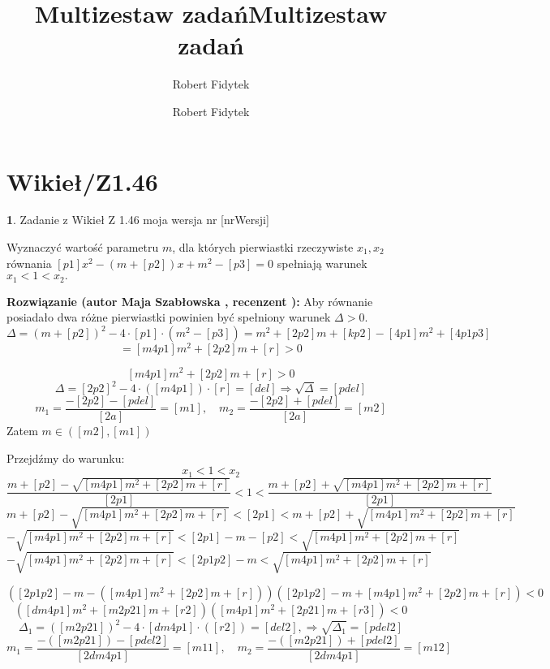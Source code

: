 \documentclass[12pt, a4paper]{article}
\title{Multizestaw zadań}
\author{Robert Fidytek}
\date{}\documentclass[12pt, a4paper]{article}
\title{Multizestaw zadań}
\author{Robert Fidytek}
\date{}
\theoremstyle{definition} %
\newtheorem{zad}{}
\theoremstyle{definition} %
\newtheorem{zad}{}
\newcommand{\kategoria}[1]{\section{#1}} %
\newcommand{\zadStart}[1]{\begin{zad}#1\newline} %
\newcommand{\zadStop}{\end{zad}}   %
\newcommand{\rozwStart}[2]{\noindent \textbf{Rozwiązanie (autor #1 , recenzent #2): }\newline} %
\begin{document}
\maketitle


\kategoria{Wikieł/Z1.46}
\zadStart{Zadanie z Wikieł Z 1.46 moja wersja nr [nrWersji]}

Wyznaczyć wartość parametru $m$, dla których pierwiastki rzeczywiste $x_{1}, x_{2}$ równania $[p1]x^{2}-(m+[p2])x+m^{2}-[p3]=0$ spełniają warunek $x_{1}<1<x_{2}.$
\zadStop

\rozwStart{Maja Szabłowska}{}
Aby równanie posiadało dwa różne pierwiastki powinien być spełniony warunek $\Delta>0.$
$$\Delta=(m+[p2])^{2}-4\cdot[p1]\cdot(m^{2}-[p3])=m^{2}+[2p2]m+[kp2]-[4p1]m^{2}+[4p1p3]$$
$$=[m4p1]m^{2}+[2p2]m+[r]>0$$

$$[m4p1]m^{2}+[2p2]m+[r]>0$$
$$\Delta=[2p2]^{2}-4\cdot([m4p1])\cdot[r]=[del] \Rightarrow \sqrt{\Delta}=[pdel]$$
$$m_{1}=\frac{-[2p2]-[pdel]}{[2a]}=[m1], \quad m_{2}=\frac{-[2p2]+[pdel]}{[2a]}=[m2]$$
Zatem $m\in([m2], [m1])$

Przejdźmy do warunku:
$$x_{1}<1<x_{2}$$
$$\frac{m+[p2]-\sqrt{[m4p1]m^{2}+[2p2]m+[r]}}{[2p1]}<1<\frac{m+[p2]+\sqrt{[m4p1]m^{2}+[2p2]m+[r]}}{[2p1]}$$
$$m+[p2]-\sqrt{[m4p1]m^{2}+[2p2]m+[r]}<[2p1]<m+[p2]+\sqrt{[m4p1]m^{2}+[2p2]m+[r]}$$
$$-\sqrt{[m4p1]m^{2}+[2p2]m+[r]}<[2p1]-m-[p2]<\sqrt{[m4p1]m^{2}+[2p2]m+[r]}$$
$$-\sqrt{[m4p1]m^{2}+[2p2]m+[r]}<[2p1p2]-m<\sqrt{[m4p1]m^{2}+[2p2]m+[r]}$$

$$([2p1p2]-m-([m4p1]m^{2}+[2p2]m+[r]))([2p1p2]-m+[m4p1]m^{2}+[2p2]m+[r])<0$$
$$([dm4p1]m^{2}+[m2p21]m+[r2])([m4p1]m^{2}+[2p21]m+[r3])<0$$
$$\Delta_{1}=([m2p21])^{2}-4\cdot[dm4p1]\cdot([r2])=[del2], \Rightarrow \sqrt{\Delta_{1}}=[pdel2]$$
$$m_{1}=\frac{-([m2p21])-[pdel2]}{[2dm4p1]}=[m11], \quad m_{2}=\frac{-([m2p21])+[pdel2]}{[2dm4p1]}=[m12]$$
\end{document}
